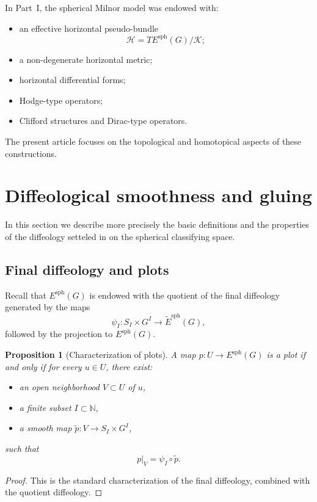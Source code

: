 \documentclass[11pt]{amsart}
\newtheorem{proposition}[definition]{Proposition}
\begin{document}
In Part~I, the spherical Milnor model was endowed with:
\begin{itemize}
\item an effective horizontal pseudo-bundle
\[
\mathcal H
=
TE^{\mathrm{sph}}(G)/\mathcal K;
\]
\item a non-degenerate horizontal metric;
\item horizontal differential forms;
\item Hodge-type operators;
\item Clifford structures and Dirac-type operators.
\end{itemize}

The present article focuses on the topological and homotopical aspects of
these constructions.

\section{Diffeological smoothness and gluing} \label{sec:glue}
In this section we describe more precisely the basic definitions and the properties of the diffeology setteled in \cite{Magnot-MilnorI} on the spherical classifying space. 
\subsection{Final diffeology and plots}

Recall that $E^{\mathrm{sph}}(G)$ is endowed with the quotient of the final diffeology generated by the maps
\[
\psi_I : S_I \times G^I \longrightarrow \widetilde E^{\mathrm{sph}}(G),
\]
followed by the projection to $E^{\mathrm{sph}}(G)$.

\begin{proposition}[Characterization of plots]
A map $p : U \to E^{\mathrm{sph}}(G)$ is a plot if and only if for every $u \in U$, there exist:
\begin{itemize}
\item an open neighborhood $V \subset U$ of $u$,
\item a finite subset $I \subset \mathbb N$,
\item a smooth map $\widetilde p : V \to S_I \times G^I$,
\end{itemize}
such that
\[
p|_V = \psi_I \circ \widetilde p.
\]
\end{proposition}

\begin{proof}
This is the standard characterization of the final diffeology, combined with the quotient diffeology.
\end{proof}
\end{document}
